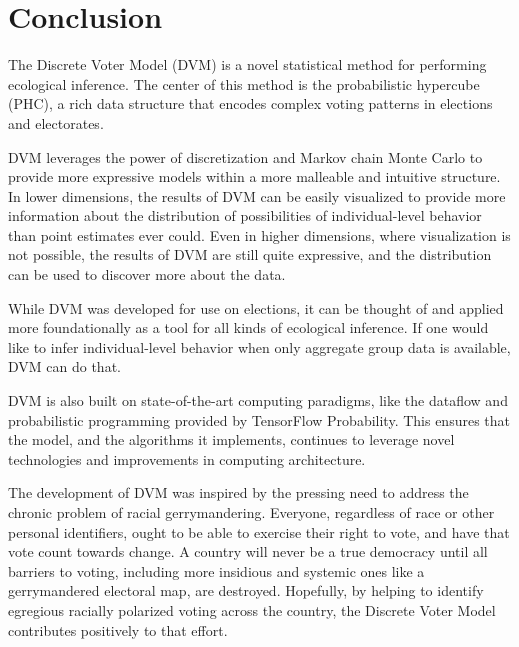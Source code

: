 \chapter{Conclusion}
\label{conclusion}

The Discrete Voter Model (DVM) is a novel statistical method for performing ecological inference. The center of this method is the probabilistic hypercube (PHC), a rich data structure that encodes complex voting patterns in elections and electorates.

DVM leverages the power of discretization and Markov chain Monte Carlo to provide more expressive models within a more malleable and intuitive structure. In lower dimensions, the results of DVM can be easily visualized to provide more information about the distribution of possibilities of individual-level behavior than point estimates ever could. Even in higher dimensions, where visualization is not possible, the results of DVM are still quite expressive, and the distribution can be used to discover more about the data.

While DVM was developed for use on elections, it can be thought of and applied more foundationally as a tool for all kinds of ecological inference. If one would like to infer individual-level behavior when only aggregate group data is available, DVM can do that.

DVM is also built on state-of-the-art computing paradigms, like the dataflow and probabilistic programming provided by TensorFlow Probability. This ensures that the model, and the algorithms it implements, continues to leverage novel technologies and improvements in computing architecture.

The development of DVM was inspired by the pressing need to address the chronic problem of racial gerrymandering. Everyone, regardless of race or other personal identifiers, ought to be able to exercise their right to vote, and have that vote count towards change. A country will never be a true democracy until all barriers to voting, including more insidious and systemic ones like a gerrymandered electoral map, are destroyed. Hopefully, by helping to identify egregious racially polarized voting across the country, the Discrete Voter Model contributes positively to that effort.
